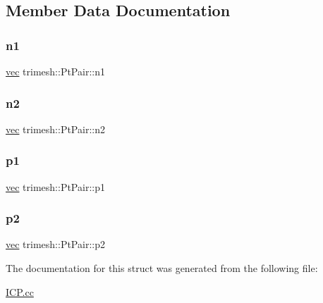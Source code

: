 \subsection{Member Data Documentation}
\mbox{\label{structtrimesh_1_1PtPair_a6c3b1065cb3a9ed70249eef0e5147c88}} 
\subsubsection{\texorpdfstring{n1}{n1}}
{\footnotesize\ttfamily \hyperlink{namespacetrimesh_a4fc2b83feba99c931f837a0c7d4b4df1}{vec} trimesh\+::\+Pt\+Pair\+::n1}

\mbox{\label{structtrimesh_1_1PtPair_aa4995639dff136290d4034041475deb2}} 
\subsubsection{\texorpdfstring{n2}{n2}}
{\footnotesize\ttfamily \hyperlink{namespacetrimesh_a4fc2b83feba99c931f837a0c7d4b4df1}{vec} trimesh\+::\+Pt\+Pair\+::n2}

\mbox{\label{structtrimesh_1_1PtPair_aea44cf2ca1df0811bde0492d52e4cf7a}} 
\subsubsection{\texorpdfstring{p1}{p1}}
{\footnotesize\ttfamily \hyperlink{namespacetrimesh_a4fc2b83feba99c931f837a0c7d4b4df1}{vec} trimesh\+::\+Pt\+Pair\+::p1}

\mbox{\label{structtrimesh_1_1PtPair_a25cf832b7c1e770e4c3de3cb3b80532d}} 
\subsubsection{\texorpdfstring{p2}{p2}}
{\footnotesize\ttfamily \hyperlink{namespacetrimesh_a4fc2b83feba99c931f837a0c7d4b4df1}{vec} trimesh\+::\+Pt\+Pair\+::p2}



The documentation for this struct was generated from the following file\+:\begin{DoxyCompactItemize}
\item 
\hyperlink{ICP_8cc}{I\+C\+P.\+cc}\end{DoxyCompactItemize}
